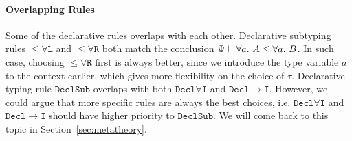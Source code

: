 \paragraph{Overlapping Rules}
Some of the declarative rules overlaps with each other.
Declarative subtyping rules $\mathtt{{\le}\forall L}$ and $\mathtt{{\le}\forall R}$
both match the conclusion $\Psi\vdash \all A \le \all B$.
In such case, choosing $\mathtt{{\le}\forall R}$ first is always better,
since we introduce the type variable $a$ to the context earlier,
which gives more flexibility on the choice of $\tau$.
Declarative typing rule $\mathtt{DeclSub}$ overlaps with
both $\mathtt{Decl\forall I}$ and $\mathtt{Decl\to I}$.
However, we could argue that more specific rules are always the best choices,
i.e. $\mathtt{Decl\forall I}$ and $\mathtt{Decl\to I}$ should have
higher priority to $\mathtt{DeclSub}$. We will come back to this
topic in Section~\ref{sec:metatheory}.
\begin{comment}
For example, $\Psi\vdash \lam x \Lto \all a\to a$ succeeds if derived from
Rule $\mathtt{Decl\forall I}$, but fails when applied to $\mathtt{DeclSub}$:
$$
\inferrule*[right={$\mathtt{Decl\forall I}$}]
	{\inferrule*[Right={$\mathtt{Decl\to I}$}]
		{\Psi,a,x:a \vdash x \Lto a}
		{\Psi,a \vdash \lam x \Lto a \to a}
	}
	{\Psi\vdash \lam x \Lto \all a \to a}
$$
$$
\inferrule*[right={$\mathtt{DeclSub}$}]
	{
		\inferrule*[right=$\mathtt{Decl\to I\To}$]
			{\Psi \vdash \blue\sigma\to \blue\tau \quad \Psi,x:\blue\sigma\vdash e \Lto \blue\tau}
			{\Psi \vdash \lam x \To \blue\sigma\to \blue\tau}\quad
		\inferrule*[Right=$\mathtt{{\le}\forall R}$]
			{\inferrule*[Right=$\mathtt{{\le}{\to}}$]
				{
					\inferrule*[Right=$?$]
						{\text{Impossible! }\blue\sigma \neq a}
						{\Psi,a \vdash a \le \blue\sigma}
					\quad \Psi,a \vdash \blue\tau \le a
				}
				{\Psi,a \vdash \blue\sigma\to \blue\tau \le a \to a}
			}
			{\Psi\vdash \blue\sigma\to \blue\tau\le \all a \to a}
	}
{\Psi\vdash \lam x \Lto \all a \to a}
$$

Rule $\mathtt{Decl\to I}$ is also better at handling higher-order types.
When the lambda-expression to be inferred has a polymorphic input type,
such as $\all a \to a$,
$\mathtt{DeclSub}$ may not derive some judgments.
For example, $\Psi,id:\all a\to a \vdash \lam[f] f~id~(f~()) \Lto (\all a\to a) \to 1$
requires the argument of the lambda-expression to be a polymorphic type,
otherwise it could not be applied to both $id$ and $()$.
If Rule $\mathtt{DeclSub}$ was chosen for derivation,
the type of its argument is restricted by Rule $\mathtt{Decl\to I\To}$,
which is not a polymorphic type.
By contrast,
Rule $\mathtt{Decl\to I}$ keeps the polymorphic argument type $\all a\to a$,
and will successfully derive the judgment.
\end{comment}

